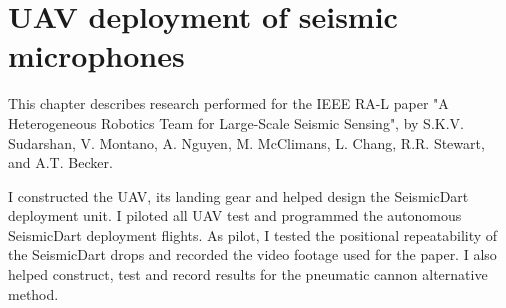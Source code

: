 \chapter[UAV deploying SeismicDarts]{UAV deployment of seismic microphones}{\label{chap:SeismicDarts}}

This chapter describes research performed for the IEEE RA-L paper "A Heterogeneous Robotics Team for Large-Scale Seismic Sensing", by S.K.V. Sudarshan, V. Montano, A. Nguyen, M. McClimans, L. Chang, R.R. Stewart, and A.T. Becker.

I constructed the UAV, its landing gear and helped design the SeismicDart deployment unit. I piloted all UAV test and programmed the autonomous SeismicDart deployment flights. As pilot, I tested the positional repeatability of the SeismicDart drops and recorded the video footage used for the paper. I also helped construct, test and record results for the pneumatic cannon alternative method.

